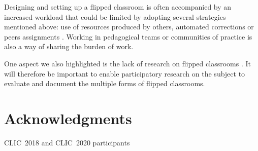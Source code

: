 \documentclass[10pt,letterpaper]{article}
\begin{document}
Designing and setting up a flipped classroom is often accompanied by an increased workload that 
could be limited by adopting several strategies mentioned above: use of resources produced by others,
automated corrections or peers assignments \cite{guilbault_classe_2017}. Working in pedagogical teams or communities of practice is also a way of sharing the burden of work.

One aspect we also highlighted is the lack of research on flipped classrooms \cite{hew_does_2020}. 
It will therefore be important to enable participatory research on the subject to evaluate 
and document the multiple forms of flipped classrooms.


\section*{Acknowledgments}
{CLIC~2018 and CLIC~2020 participants}

\nolinenumbers

%
%
% 


\end{document}
